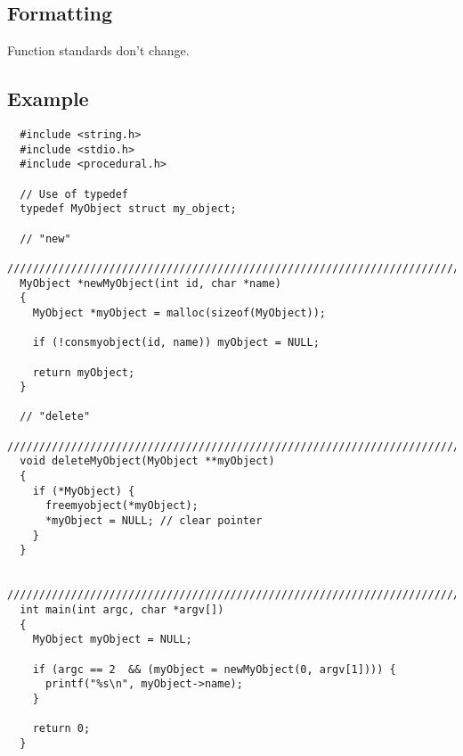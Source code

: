 \documentclass{article}
\begin{document}
\subsection{Formatting}
Function standards don't change.

\pagebreak

\subsection{Example}

\begin{lstlisting}
  #include <string.h>
  #include <stdio.h>
  #include <procedural.h>

  // Use of typedef
  typedef MyObject struct my_object;

  // "new"
  ////////////////////////////////////////////////////////////////////////////////
  MyObject *newMyObject(int id, char *name)
  {
    MyObject *myObject = malloc(sizeof(MyObject));
    
    if (!consmyobject(id, name)) myObject = NULL;

    return myObject;
  }

  // "delete"
  ////////////////////////////////////////////////////////////////////////////////
  void deleteMyObject(MyObject **myObject)
  {
    if (*MyObject) {
      freemyobject(*myObject);
      *myObject = NULL; // clear pointer
    }
  }

  ////////////////////////////////////////////////////////////////////////////////
  int main(int argc, char *argv[])
  {
    MyObject myObject = NULL;

    if (argc == 2  && (myObject = newMyObject(0, argv[1]))) {
      printf("%s\n", myObject->name);
    }
    
    return 0;
  }

\end{lstlisting}
\end{document}
